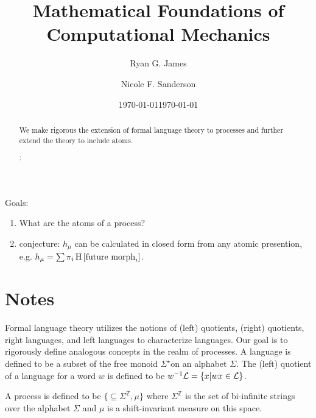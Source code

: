 \documentclass[prl,twocolumn,superscriptaddress,preprintnumbers,floatfix]{revtex4-1}
\begin{document}
\title{Mathematical Foundations of Computational Mechanics}

\author{Ryan G. James}

\author{Nicole F. Sanderson}

\date{\today}


\date{\today}

\begin{abstract}

We make rigorous the extension of formal language theory to processes and further extend the theory to include atoms. 

\vspace{0.1in}
:

\end{abstract}

\maketitle

Goals:
\begin{enumerate}
  \item What are the atoms of a process?
  \item conjecture: $h_\mu$ can be calculated in closed form from any atomic presention, e.g. $h_\mu = \sum \pi_i \operatorname{H}\left[\textrm{future morph}_i\right]$.
\end{enumerate}

\section{Notes}
Formal language theory utilizes the notions of (left) quotients, (right) quotients, right languages, and left languages to characterize languages.  Our goal is to rigorously define analogous concepts in the realm of processes.  A language \Language is defined to be a subset of the free monoid $\Sigma^{\star}$on an alphabet $\Sigma$. The (left) quotient of a language \Language for a word $w$ is defined to be $w^{-1}\mathcal{L} = \{ x | wx \in \mathcal{L} \}$. 

A process \Process is defined to be $\{\subseteq \Sigma^{\mathbb{Z}}, \mu\}$ where $\Sigma^{\mathbb{Z}}$ is the set of bi-infinite strings over the alphabet $\Sigma$ and $\mu$ is a shift-invariant measure on this space.  
\end{document}
